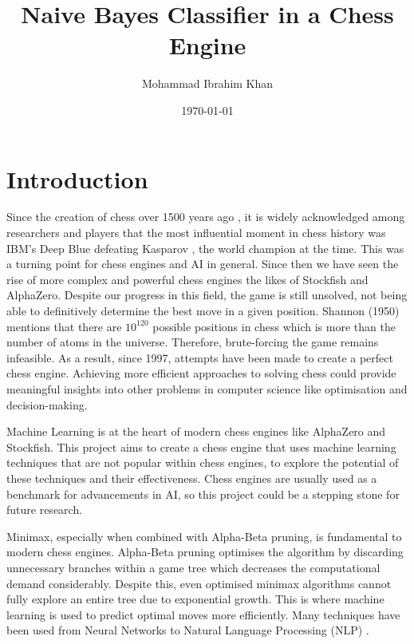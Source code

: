 \documentclass[20pt]{informatics-report}
\title{Naive Bayes Classifier in a Chess Engine}
\author{Mohammad Ibrahim Khan}
\date{\today}
\begin{document}
\createFrontMatter
\onehalfspacing
\tableofcontents
\doublespacing


\chapter{Introduction}


Since the creation of chess over 1500 years ago \cite{davidsonShortHistoryChess2012}, it is widely acknowledged among researchers and players that the most influential moment in chess history was IBM's Deep Blue defeating Kasparov \cite{hsuIBMsDeepBlue1999}, the world champion at the time. This was a turning point for chess engines and AI in general.
Since then we have seen the rise of more complex and powerful chess engines the likes of Stockfish and AlphaZero. Despite our progress in this field, the game is still unsolved, not being able to definitively determine the best move in a given position. Shannon (1950) mentions that there are $10^{120}$ possible positions in chess \cite{shannonXXIIProgrammingComputer1950} which is more than the number of atoms in the universe. Therefore, brute-forcing the game remains infeasible. As a result, since 1997, attempts have been made to create a perfect chess engine. Achieving more efficient approaches to solving chess could provide meaningful insights into other problems in computer science like optimisation and decision-making.

Machine Learning is at the heart of modern chess engines like AlphaZero and Stockfish.  
This project aims to create a chess engine that uses machine learning techniques that are not popular within chess engines, to explore the potential of these techniques and their effectiveness. Chess engines are usually used as a benchmark for advancements in AI, so this project could be a stepping stone for future research. 

Minimax, especially when combined with Alpha-Beta pruning, is fundamental to modern chess engines. Alpha-Beta pruning optimises the algorithm by discarding unnecessary branches within a game tree which decreases the computational demand considerably. Despite this, even optimised minimax algorithms cannot fully explore an entire tree due to exponential growth. This is where machine learning is used to predict optimal moves more efficiently. Many techniques have been used from Neural Networks \cite{kleinNeuralNetworksChess2022} to Natural Language Processing (NLP) \cite{NLPinChess}. 
\end{document}
